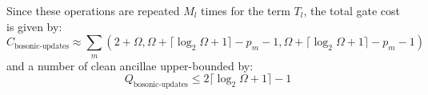 Since these operations are repeated $M_l$ times for the term $T_l$, the total gate cost is given by:
\begin{equation}
    C_\text{bosonic-updates} \approx \sum_m (2 + \Omega, \Omega + \lceil \log_2{\Omega + 1} \rceil - p_m - 1, \Omega + \lceil \log_2{\Omega + 1} \rceil - p_m - 1)
\end{equation}
and a number of clean ancillae upper-bounded by:
\begin{equation}
    \label{eq:ancillae-bosonic-updates}
    Q_\text{bosonic-updates} \leq 2 \lceil \log_2{\Omega + 1} \rceil - 1
\end{equation}



